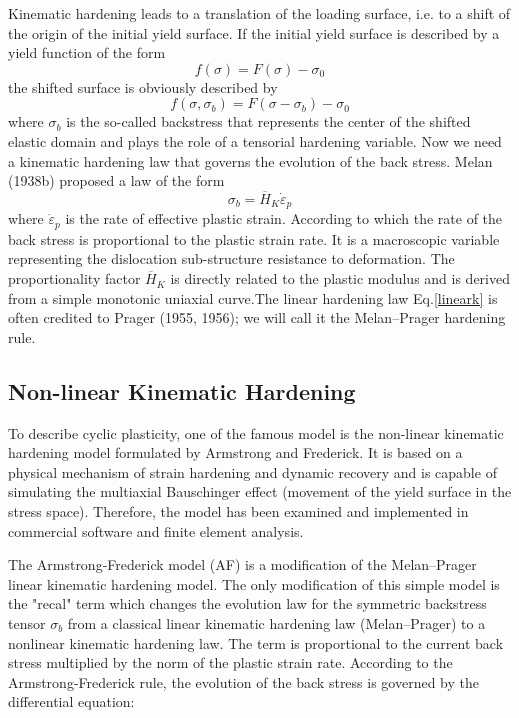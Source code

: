 Kinematic hardening leads to a translation of the loading surface, i.e. to a shift of
the origin of the initial yield surface. If the initial yield surface is described by a yield
function of the form
$$f(\sigma) = F(\sigma) -\sigma_0 $$
the shifted surface is obviously described by
$$f(\sigma,\sigma_b ) = F(\sigma-\sigma_b ) -\sigma_0$$
where $\sigma_b$ is the so-called backstress that represents the center of the shifted elastic
domain and plays the role of a tensorial hardening variable. Now we need a kinematic
hardening law that governs the evolution of the back stress. Melan (1938b) proposed
a law of the form
\begin{equation}
\sigma_b =\overline{H}_K \dot{\varepsilon}_p
\label{lineark}
\end{equation}
where $ \dot{\varepsilon}_p$ is the rate of effective plastic strain. According to which the rate of the back stress is proportional to the plastic strain rate. It is a macroscopic variable representing the
dislocation sub-structure resistance to deformation. 
The proportionality factor $\overline{H}_K$ is directly related to the plastic modulus and is derived from a simple
monotonic uniaxial curve.The linear hardening law Eq.\eqref{lineark} is often credited to Prager (1955, 1956); we will call it the Melan–Prager hardening rule. 
\subsection{Non-linear Kinematic Hardening}
To describe cyclic plasticity, one of the famous model is the non-linear kinematic hardening model formulated by Armstrong and Frederick. It is based on a physical mechanism of strain hardening and dynamic recovery and is capable of simulating the
multiaxial Bauschinger effect (movement of the yield surface in the stress space). Therefore, the model has been examined and implemented in commercial software and finite element analysis.

The Armstrong-Frederick model (AF) is a modification of the Melan–Prager linear kinematic hardening model. The only modification of this simple model is the "recal" term which changes the evolution law for the symmetric backstress tensor $\sigma_b$ from a classical linear kinematic hardening law (Melan–Prager) to a nonlinear kinematic hardening law. The term is proportional to the current back stress multiplied by the norm of the plastic strain rate. According to the Armstrong-Frederick rule, the evolution of the
back stress is governed by the differential equation:

